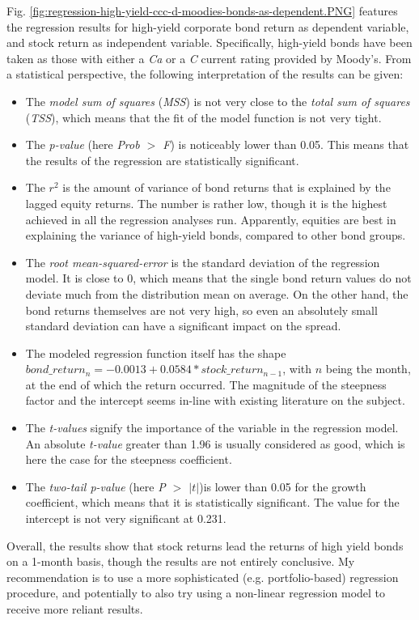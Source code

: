Fig. \ref{fig:regression-high-yield-ccc-d-moodies-bonds-as-dependent.PNG} features the regression results for high-yield corporate bond return as dependent variable, and stock return as independent variable. Specifically, high-yield bonds have been taken as those with either a \textit{Ca} or a \textit{C} current rating provided by Moody's. From a statistical perspective, the following interpretation of the results can be given: 
\begin{itemize}
	\item The \textit{model sum of squares} (\textit{MSS}) is not very close to the \textit{total sum of squares} (\textit{TSS}), which means that the fit of the model function is not very tight. 
	\item The \textit{p-value} (here \textit{Prob $>$ F}) is noticeably lower than 0.05. This means that the results of the regression are statistically significant. 
	\item The $r^2$ is the amount of variance of bond returns that is explained by the lagged equity returns. The number is rather low, though it is the highest achieved in all the regression analyses run. Apparently, equities are best in explaining the variance of high-yield bonds, compared to other bond groups.
	\item The \textit{root mean-squared-error} is the standard deviation of the regression model. It is close to 0, which means that the single bond return values do not deviate much from the distribution mean on average. On the other hand, the bond returns themselves are not very high, so even an absolutely small standard deviation can have a significant impact on the spread. 
	\item The modeled regression function itself has the shape $bond\_return_{n} = -0.0013 + 0.0584 * stock\_return_{n-1}$, with $n$ being the month, at the end of which the return occurred. The magnitude of the steepness factor and the intercept seems in-line with existing literature on the subject. 
	\item The \textit{t-values} signify the importance of the variable in the regression model. An absolute \textit{t-value} greater than 1.96 is usually considered as good, which is here the case for the steepness coefficient.  
	\item The \textit{two-tail p-value} (here \textit{P $>$ $|t|$})is lower than 0.05 for the growth coefficient, which means that it is statistically significant. The value for the intercept is not very significant at 0.231. 
\end{itemize}
Overall, the results show that stock returns lead the returns of high yield bonds on a 1-month basis, though the results are not entirely conclusive. My recommendation is to use a more sophisticated (e.g. portfolio-based) regression procedure, and potentially to also try using a non-linear regression model to receive more reliant results. 

